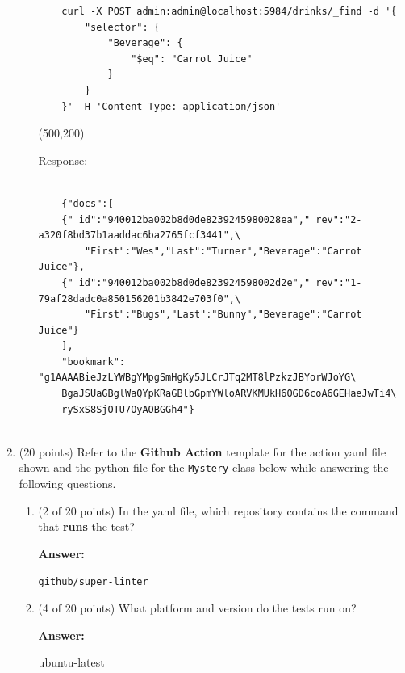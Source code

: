 \documentclass[10pt]{article}
\begin{document}
\begin{enumerate}
\begin{enumerate}
\begin{lstlisting}
	curl -X POST admin:admin@localhost:5984/drinks/_find -d '{
		"selector": {
			"Beverage": {
				"$eq": "Carrot Juice"
			}
		}
	}' -H 'Content-Type: application/json'

\end{lstlisting}
\else


\hspace*{-0.4in}\framebox(500,200){}


\fi
Response:
\begin{lstlisting}
	
	{"docs":[
	{"_id":"940012ba002b8d0de8239245980028ea","_rev":"2-a320f8bd37b1aaddac6ba2765fcf3441",\
		"First":"Wes","Last":"Turner","Beverage":"Carrot Juice"},
	{"_id":"940012ba002b8d0de823924598002d2e","_rev":"1-79af28dadc0a850156201b3842e703f0",\
		"First":"Bugs","Last":"Bunny","Beverage":"Carrot Juice"}
	],
	"bookmark": "g1AAAABieJzLYWBgYMpgSmHgKy5JLCrJTq2MT8lPzkzJBYorWJoYG\
	BgaJSUaGBglWaQYpKRaGBlbGpmYWloARVKMUkH6OGD6coA6GEHaeJwTi4\
	rySxS8SjOTU7OyAOBGGh4"}
	
\end{lstlisting}

\end{enumerate}

\newpage

\item (20 points) Refer to the \textbf{Github Action} template for the action yaml file shown and the python file for the \verb*|Mystery| class below while
	answering the following questions.
	




\begin{enumerate}
	\item (2 of 20 points) In the yaml file, which repository contains  the command that \textbf{runs} the test?
	
	\beginanswers
		\textbf{Answer:}

		\bigskip
		\verb|github/super-linter|
		\bigskip
	\else
	\bigskip
	\bigskip
	\bigskip
	\bigskip
	\bigskip
	\bigskip
	\bigskip
	\bigskip
	\bigskip
	\bigskip
	\fi

	\item (4 of 20 points) What platform and version do the tests run on?
	
	\beginanswers
		\textbf{Answer:}

		\bigskip
	ubuntu-latest
		\bigskip
	\else
	\bigskip
	\bigskip
	\bigskip
	\bigskip
	\bigskip
	\bigskip
	\bigskip
	\bigskip
	\bigskip
	\bigskip
	\fi


\end{enumerate}
\end{enumerate}
\end{document}
